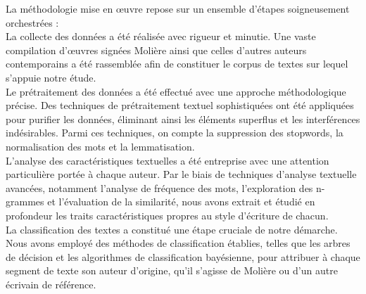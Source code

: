 \vspace{\baselineskip}
\hspace{0,5cm}La méthodologie mise en œuvre repose sur un ensemble d'étapes soigneusement
orchestrées :
\\La collecte des données a été réalisée avec rigueur et minutie. Une vaste
compilation d'œuvres signées Molière ainsi que celles d'autres auteurs
contemporains a été rassemblée afin de constituer le corpus de textes sur lequel
s'appuie notre étude. 
\\Le prétraitement des données a été effectué avec une approche méthodologique
précise. Des techniques de prétraitement textuel sophistiquées ont été
appliquées pour purifier les données, éliminant ainsi les éléments superflus et
les interférences indésirables. Parmi ces techniques, on compte la suppression
des stopwords, la normalisation des mots et la lemmatisation. 
\\L'analyse des caractéristiques textuelles a été entreprise avec une attention
particulière portée à chaque auteur. Par le biais de techniques d'analyse
textuelle avancées, notamment l'analyse de fréquence des mots, l'exploration des
n-grammes et l'évaluation de la similarité, nous avons extrait et étudié en
profondeur les traits caractéristiques propres au style d'écriture de chacun. 
\\La classification des textes a constitué une étape cruciale de notre démarche.
Nous avons employé des méthodes de classification établies, telles que les
arbres de décision et les algorithmes de classification bayésienne, pour
attribuer à chaque segment de texte son auteur d'origine, qu'il s'agisse de
Molière ou d'un autre écrivain de référence. 